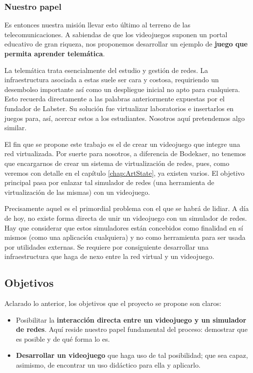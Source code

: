 \subsubsection{Nuestro papel}
Es entonces nuestra misión llevar esto último al terreno de las telecomunicaciones. A sabiendas de que los videojuegos suponen un portal educativo de gran riqueza, nos proponemos desarrollar un ejemplo de \textbf{juego que permita aprender telemática}.

La telemática trata esencialmente del estudio y gestión de redes. La infraestructura asociada a estas suele ser cara y costosa, requiriendo un desembolso importante así como un despliegue inicial no apto para cualquiera. Esto recuerda directamente a las palabras anteriormente expuestas por el fundador de Labster. Su solución fue virtualizar laboratorios e insertarlos en juegos para, así, acercar estos a los estudiantes. Nosotros aquí pretendemos algo similar.

El fin que se propone este trabajo es el de crear un videojuego que integre una red virtualizada. Por suerte para nosotros, a diferencia de Bodekaer, no tenemos que encargarnos de crear un sistema de virtualización de redes, pues, como veremos con detalle en el capítulo \ref{chap:ArtState}, ya existen varios. El objetivo principal pasa por enlazar tal simulador de redes (una herramienta de virtualización de las mismas) con un videojuego.

Precisamente aquel es el primordial problema con el que se habrá de lidiar. A día de hoy, no existe forma directa de unir un videojuego con un simulador de redes. Hay que considerar que estos simuladores están concebidos como finalidad en sí mismos (como una aplicación cualquiera) y no como herramienta para ser usada por utilidades externas. Se requiere por consiguiente desarrollar una infraestructura que haga de nexo entre la red virtual y un videojuego.
 
\subsection{Objetivos}
Aclarado lo anterior, los objetivos que el proyecto se propone son claros:
\begin{itemize}
\item Posibilitar la \textbf{interacción directa entre un videojuego y un simulador de redes}. Aquí reside nuestro papel fundamental del proceso: demostrar que es posible y de qué forma lo es.
\item \textbf{Desarrollar un videojuego} que haga uso de tal posibilidad; que sea capaz, asimismo, de encontrar un uso didáctico para ella y aplicarlo.
\end{itemize}

